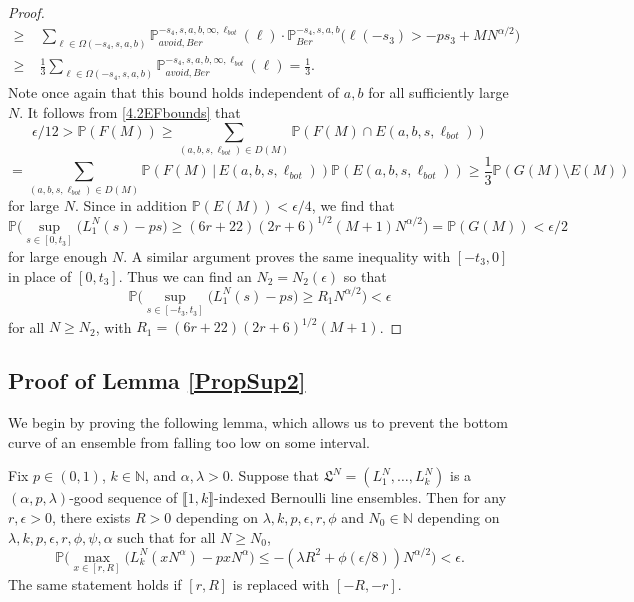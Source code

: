\begin{proof}
\begin{align*}
	\geq \; & \sum_{\ell\in\Omega(-s_4,s,a,b)} \mathbb{P}^{-s_4,s,a,b,\infty,\ell_{bot}}_{avoid, Ber}(\ell)\cdot \mathbb{P}^{-s_4,s,a,b}_{Ber}\big(\ell(-s_3) > -ps_3 + MN^{\alpha/2}\big)\\
	\geq \; & \frac{1}{3}\sum_{\ell\in\Omega(-s_4,s,a,b)} \mathbb{P}^{-s_4,s,a,b,\infty,\ell_{bot}}_{avoid, Ber}(\ell) = \frac{1}{3}.
	\end{align*}
	Note once again that this bound holds independent of $a,b$ for all sufficiently large $N$. It follows from \eqref{4.2EFbounds} that
	\[
	\epsilon/12 > \mathbb{P}(F(M)) \geq \sum_{(a,b,s,\ell_{bot})\in D(M)} \mathbb{P}(F(M)\cap E(a,b,s,\ell_{bot}))
	\]
	\[
	= \sum_{(a,b,s,\ell_{bot})\in D(M)} \mathbb{P}(F(M)\,|\, E(a,b,s,\ell_{bot}))\mathbb{P}(E(a,b,s,\ell_{bot})) \geq \frac{1}{3}\mathbb{P}(G(M)\setminus E(M))
	\]
	for large $N$. Since in addition $\mathbb{P}(E(M)) < \epsilon/4$, we find that
	\[
	\mathbb{P}\Big( \sup_{s \in [0,t_3] }\big( L^N_1(s) - p s \big) \geq  (6r+22)(2r+6)^{1/2}(M+1)N^{\alpha/2} \Big) = \mathbb{P}(G(M)) < \epsilon/2
	\]
	for large enough $N$. A similar argument proves the same inequality with $[-t_3,0]$ in place of $[0,t_3]$. Thus we can find an $N_2 = N_2(\epsilon)$ so that
	\[
	\mathbb{P}\Big( \sup_{s \in [-t_3,t_3] }\big( L^N_1(s) - p s \big) \geq  R_1N^{\alpha/2} \Big) < \epsilon
	\]
	for all $N\geq N_2$, with $R_1 = (6r+22)(2r+6)^{1/2}(M+1)$.
	
\end{proof}
	
	
\subsection{Proof of Lemma \ref{PropSup2}}

	We begin by proving the following lemma, which allows us to prevent the bottom curve of an ensemble from falling too low on some interval.
	
	\begin{lemma}\label{21}
		Fix $p\in (0,1)$, $k\in\mathbb{N}$, and $\alpha,\lambda > 0$. Suppose that $\mathfrak{L}^N = (L_1^N, \dots, L_k^N)$ is a $(\alpha,p,\lambda)$-good sequence of $\llbracket 1, k\rrbracket$-indexed Bernoulli line ensembles. Then for any $r,\epsilon>0$, there exists $R>0$ depending on $\lambda,k,p,\epsilon,r,\phi$ and $N_0 \in \mathbb{N}$ depending on $\lambda,k,p,\epsilon,r,\phi,\psi,\alpha$ such that for all $N\geq N_0$,
		\[
		\mathbb{P}\Big(\max_{x\in[r,R]} \big(L_k^N(xN^\alpha) - pxN^\alpha\big) \leq -(\lambda R^2 + \phi(\epsilon/8))N^{\alpha/2}\Big) < \epsilon.
		\]
		The same statement holds if $[r,R]$ is replaced with $[-R,-r]$.
	\end{lemma}

